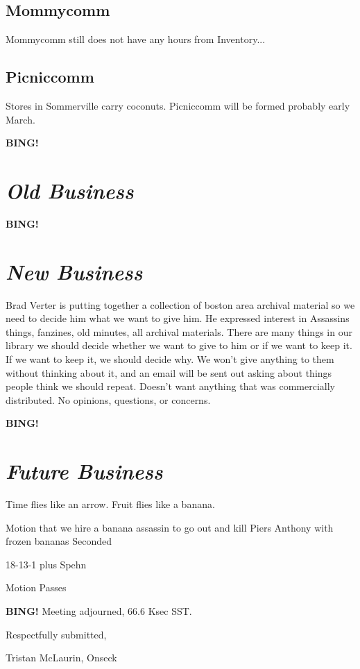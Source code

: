 \documentclass[10pt]{article}
\newcommand{\bing}{{\bf BING!} }
\newcommand{\goto}[1]{\bing \vskip 12pt \section*{{\em{#1}}}}
\newcommand{\ps}{ plus Spehn\xspace}
\newcommand{\onseck}{Tristan McLaurin, Onseck}
\begin{document}
\subsection*{Mommycomm}
Mommycomm still does not have any hours from Inventory...

\subsection*{Picniccomm}
Stores in Sommerville carry coconuts. Picniccomm will be formed probably early March.

\goto{Old Business}

\goto{New Business}
Brad Verter is putting together a collection of boston area archival material so we need to decide him what we want to give him. He expressed interest in Assassins things, fanzines, old minutes, all archival materials. There are many things in our library we should decide whether we want to give to him or if we want to keep it. If we want to keep it, we should decide why. We won't give anything to them without thinking about it, and an email will be sent out asking about things people think we should repeat. Doesn't want anything that was commercially distributed. 
No opinions, questions, or concerns.

\goto{Future Business}
Time flies like an arrow. Fruit flies like a banana.

Motion that we hire a banana assassin to go out and kill Piers Anthony with frozen bananas
Seconded

18-13-1\ps

Motion Passes

\bing
\noindent
Meeting adjourned, 66.6 Ksec SST.

\vspace{18pt}

\centerline{Respectfully submitted,}
\centerline{\onseck}
\end{document}

